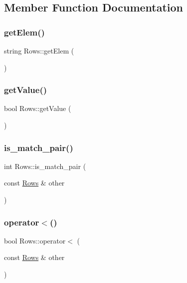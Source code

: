 \subsection{Member Function Documentation}
\mbox{\label{class_rows_ae448dbf8255ceeea29a21125433f9e42}} 
\subsubsection{\texorpdfstring{get\+Elem()}{getElem()}}
{\footnotesize\ttfamily string Rows\+::get\+Elem (\begin{DoxyParamCaption}{ }\end{DoxyParamCaption})}

\mbox{\label{class_rows_a1c7fca7d12a6195f1c68ca7f7b40559d}} 
\subsubsection{\texorpdfstring{get\+Value()}{getValue()}}
{\footnotesize\ttfamily bool Rows\+::get\+Value (\begin{DoxyParamCaption}{ }\end{DoxyParamCaption})}

\mbox{\label{class_rows_a0c7d1d2c3af24b8de6c88885ad90d68e}} 
\subsubsection{\texorpdfstring{is\+\_\+match\+\_\+pair()}{is\_match\_pair()}}
{\footnotesize\ttfamily int Rows\+::is\+\_\+match\+\_\+pair (\begin{DoxyParamCaption}\item[{const \hyperlink{class_rows}{Rows} \&}]{other }\end{DoxyParamCaption})}

\mbox{\label{class_rows_ae8eb3bed11f3a6ac4721aa27e1489106}} 
\subsubsection{\texorpdfstring{operator$<$()}{operator<()}}
{\footnotesize\ttfamily bool Rows\+::operator$<$ (\begin{DoxyParamCaption}\item[{const \hyperlink{class_rows}{Rows} \&}]{other }\end{DoxyParamCaption})}

